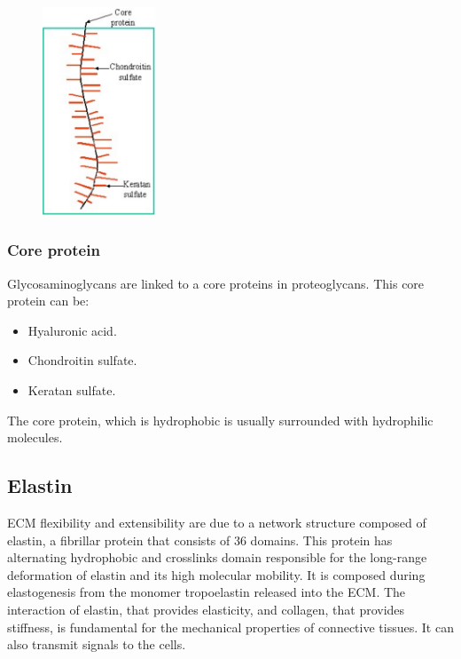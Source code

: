 	\begin{figure}[ht]
		\centering
		\includegraphics[width=0.3\textwidth]{pgag}
		\caption{\label{fig:pgag}}
	\end{figure}


		\subsubsection{Core protein}
		Glycosaminoglycans are linked to a core proteins in proteoglycans.
		This core protein can be:

		\begin{multicols}{2}
			\begin{itemize}
				\item Hyaluronic acid.
				\item Chondroitin sulfate.
				\item Keratan sulfate.
			\end{itemize}
		\end{multicols}

		The core protein, which is hydrophobic is usually surrounded with hydrophilic molecules.

		\subsection{Elastin}
		ECM flexibility and extensibility are due to a network structure composed of elastin, a fibrillar protein that consists of $36$ domains.
		This protein has alternating hydrophobic and crosslinks domain responsible for the long-range deformation of elastin and its high molecular mobility.
		It is composed during elastogenesis from the monomer tropoelastin released into the ECM.
		The interaction of elastin, that provides elasticity, and collagen, that provides stiffness, is fundamental for the mechanical properties of connective tissues.
		It can also transmit signals to the cells.

